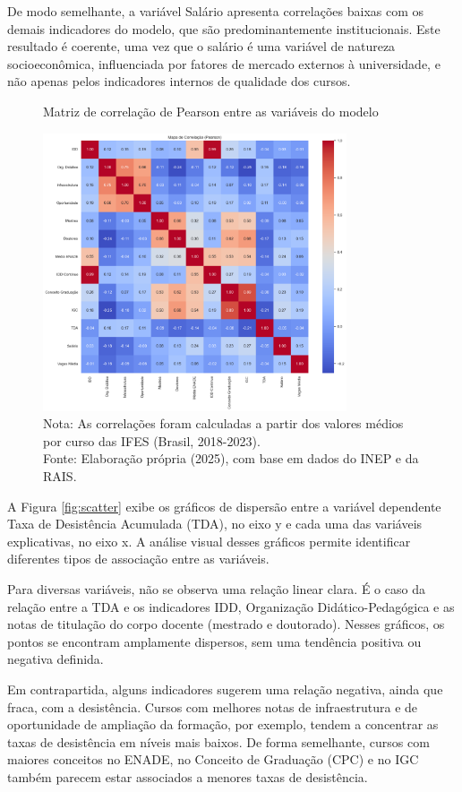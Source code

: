 De modo semelhante, a variável Salário apresenta correlações baixas com os demais indicadores do modelo, que são predominantemente institucionais. Este resultado é coerente, uma vez que o salário é uma variável de natureza socioeconômica, influenciada por fatores de mercado externos à universidade, e não apenas pelos indicadores internos de qualidade dos cursos.

\begin{figure}[H]
    \centering
    \caption{Matriz de correlação de Pearson entre as variáveis do modelo}
    \label{fig:corr}
    \includegraphics[width=0.8\textwidth]{fig3_correlation.png}
    \caption*{Nota: As correlações foram calculadas a partir dos valores médios por curso das IFES (Brasil, 2018-2023). \\ Fonte: Elaboração própria (2025), com base em dados do INEP e da RAIS.}
\end{figure}

A Figura \ref{fig:scatter} exibe os gráficos de dispersão entre a variável dependente Taxa de Desistência Acumulada (TDA), no eixo y e cada uma das variáveis explicativas, no eixo x. A análise visual desses gráficos permite identificar diferentes tipos de associação entre as variáveis.

Para diversas variáveis, não se observa uma relação linear clara. É o caso da relação entre a TDA e os indicadores IDD, Organização Didático-Pedagógica e as notas de titulação do corpo docente (mestrado e doutorado). Nesses gráficos, os pontos se encontram amplamente dispersos, sem uma tendência positiva ou negativa definida.

Em contrapartida, alguns indicadores sugerem uma relação negativa, ainda que fraca, com a desistência. Cursos com melhores notas de infraestrutura e de oportunidade de ampliação da formação, por exemplo, tendem a concentrar as taxas de desistência em níveis mais baixos. De forma semelhante, cursos com maiores conceitos no ENADE, no Conceito de Graduação (CPC) e no IGC também parecem estar associados a menores taxas de desistência.

